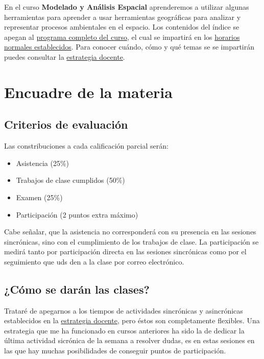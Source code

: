 \documentclass[
]{book}
\providecommand{\tightlist}{%
  \setlength{\itemsep}{0pt}\setlength{\parskip}{0pt}}
\begin{document}
En el curso \textbf{Modelado y Análisis Espacial} aprenderemos a utilizar algunas herramientas para aprender a usar herramientas geográficas para analizar y representar procesos ambientales en el espacio. Los contenidos del índice se apegan al \href{Programa-curso.pdf}{programa completo del curso}, el cual se impartirá en los \href{Horario.pdf}{horarios normales establecidos}. Para conocer cuándo, cómo y qué temas se se impartirán puedes consultar la \href{Estrategia-docente.pdf}{estrategia docente}.

\hypertarget{encuadre-de-la-materia}{%
\chapter{Encuadre de la materia}\label{encuadre-de-la-materia}}

\hypertarget{criterios-de-evaluaciuxf3n}{%
\section{Criterios de evaluación}\label{criterios-de-evaluaciuxf3n}}

Las constribuciones a cada calificación parcial serán:

\begin{itemize}
\tightlist
\item
  Asistencia (25\%)
\item
  Trabajos de clase cumplidos (50\%)
\item
  Examen (25\%)
\item
  Participación (2 puntos extra máximo)
\end{itemize}

Cabe señalar, que la asistencia no corresponderá con su presencia en las sesiones sincrónicas, sino con el cumplimiento de los trabajos de clase. La participación se medirá tanto por participación directa en las sesiones sincrónicas como por el seguimiento que uds den a la clase por correo electrónico.

\hypertarget{cuxf3mo-se-daruxe1n-las-clases}{%
\section{¿Cómo se darán las clases?}\label{cuxf3mo-se-daruxe1n-las-clases}}

Trataré de apegarnos a los tiempos de actividades sincrónicas y asincrónicas establecidos en la \href{Estrategia-docente.pdf}{estrategia docente}, pero éstos son completamente flexibles. Una estrategia que me ha funcionado en cursos anteriores ha sido la de dedicar la última actividad sicrónica de la semana a resolver dudas, es en estas sesiones en las que hay muchas posibilidades de conseguir puntos de participación.
\end{document}
